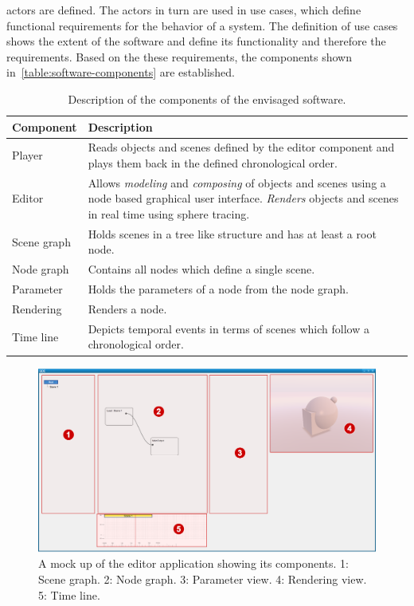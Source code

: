 \documentclass[%
    a4paper,    %
    justified,  %
    nobib,      %
    openany     %
]{tufte-book}
\begin{document}
 actors are defined. The actors in turn are
used in use cases, which define functional requirements for the behavior of a
system. The definition of use cases shows the extent of the software and define
its functionality and therefore the requirements. Based on the these
requirements, the components shown in~\autoref{table:software-components} are
established.

\begin{table}[h]
  \caption{Description of the components of the envisaged software.}
  \label{table:software-components}
  \begin{tabularx}{\textwidth}{lX}
    \toprule
    \textbf{Component} & \textbf{Description} \\
    \midrule
    Player & Reads objects and scenes defined by the editor component and plays
    them back in the defined chronological order.\\
    Editor & Allows \textit{modeling} and \textit{composing} of objects and
    scenes using a node based graphical user interface. \textit{Renders} objects
    and scenes in real time using sphere tracing. \\
    \midrule
    Scene graph & Holds scenes in a tree like structure and has at least a root
    node.\\
    Node graph & Contains all nodes which define a single scene.\\
    Parameter & Holds the parameters of a node from the node graph.\\
    Rendering & Renders a node.\\
    Time line & Depicts temporal events in terms of scenes which follow a
    chronological order.\\ 
    \bottomrule
  \end{tabularx}
\end{table}

\begin{figure}[h]
  \caption{%
    A mock up of the editor application showing its components.\newline{}
    1: Scene graph.\newline{}
    2: Node graph.\newline{}
    3: Parameter view.\newline{}
    4: Rendering view.\newline{}
    5: Time line.
  }
  \label{fig:editor-components}
  \includegraphics[width=0.95\linewidth]{images/editor-components}
\end{figure}
\end{document}
